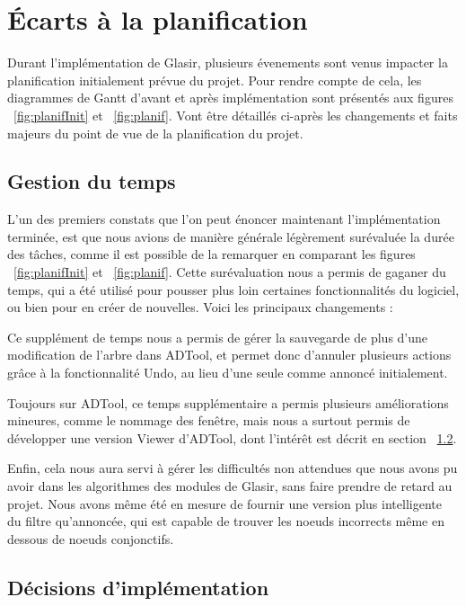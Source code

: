 \section{Écarts à la planification}
\label{sec:ecarts}

Durant l'implémentation de Glasir, plusieurs évenements sont venus impacter la planification initialement prévue du projet. Pour rendre compte de cela, les diagrammes de Gantt d'avant et après implémentation sont présentés aux figures ~\ref{fig:planifInit} et  ~\ref{fig:planif}. Vont être détaillés ci-après les changements et faits majeurs du point de vue de la planification du projet. 

\subsection{Gestion du temps}

L'un des premiers constats que l'on peut énoncer maintenant l'implémentation terminée, est que nous avions de manière générale légèrement surévaluée la durée des tâches, comme il est possible de la remarquer en comparant les figures ~\ref{fig:planifInit} et  ~\ref{fig:planif}. Cette surévaluation nous a permis de gaganer du temps, qui a été utilisé pour pousser plus loin certaines fonctionnalités du logiciel, ou bien pour en créer de nouvelles. Voici les principaux changements :

Ce supplément de temps nous a permis de gérer la sauvegarde de plus d'une modification de l'arbre dans ADTool, et permet donc d'annuler plusieurs actions grâce à la fonctionnalité Undo, au lieu d'une seule comme annoncé initialement.

Toujours sur ADTool, ce temps supplémentaire a permis plusieurs améliorations mineures, comme le nommage des fenêtre, mais nous a surtout permis de développer une version \og Viewer \fg d'ADTool, dont l'intérêt est décrit en section ~\ref{sec:decisions}.

Enfin, cela nous aura servi à gérer les difficultés non attendues que nous avons pu avoir dans les algorithmes des modules de Glasir, sans faire prendre de retard au projet. Nous avons même été en mesure de fournir une version plus intelligente du filtre qu'annoncée, qui est capable de trouver les noeuds incorrects même en dessous de noeuds conjonctifs.  

\subsection{Décisions d'implémentation}
\label{sec:decisions}

